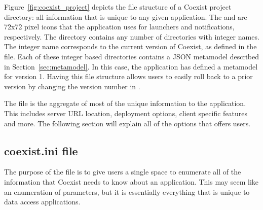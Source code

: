 Figure~\ref{fig:coexist_project} depicts the file structure of a Coexist project
directory: all information that is unique to any given application. The
 and  are 72x72 pixel icons that the
application uses for launchers and notifications, respectively. The 
directory contains any number of directories with integer names. The integer
name corresponds to the current version of Coexist, as defined in the
 file. Each of these integer based directories contains a JSON
metamodel described in Section~\ref{sec:metamodel}. In this case, the
application has defined a metamodel for version 1. Having this file structure
allows users to easily roll back to a prior version by changing the version
number in . 

The  file is the aggregate of most of the unique information to
the application. This includes server URL location, deployment options, client
specific features and more. The following section will explain all of the
options that  offers users. 


\subsection{coexist.ini file}  \label{sec:ini}

The purpose of the  file is to give users a single space to
enumerate all of the information that Coexist needs to know about an
application. This may seem like an enumeration of parameters, but it is
essentially everything that is unique to data access applications.


